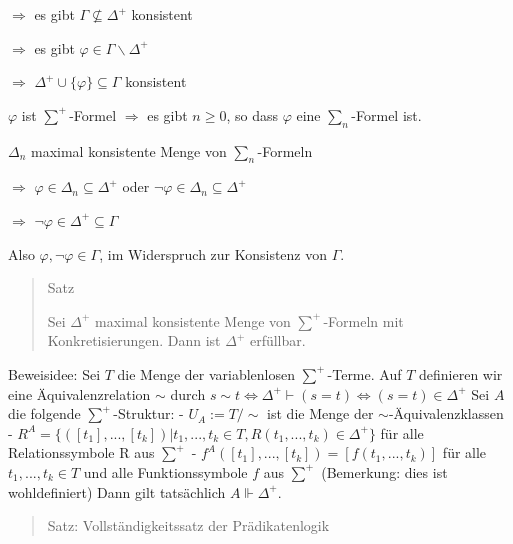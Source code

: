 \documentclass[a4paper]{article}
\begin{document}
\begin{multicols}{3}
\begin{itemize*}
          \begin{itemize*}
            \item
                  $\Rightarrow$ es gibt $\Gamma\not\subseteq\Delta^+$ konsistent
            \item
                  $\Rightarrow$ es gibt $\varphi\in\Gamma\backslash\Delta^+$
            \item
                  $\Rightarrow$ $\Delta^+\cup\{\varphi\}\subseteq\Gamma$ konsistent
            \item
                  $\varphi$ ist $\sum^+$-Formel $\Rightarrow$ es gibt $n\geq 0$, so
                  dass $\varphi$ eine $\sum_n$-Formel ist.
            \item
                  $\Delta_n$ maximal konsistente Menge von $\sum_n$-Formeln
            \item
                  $\Rightarrow$ $\varphi\in\Delta_n\subseteq\Delta^+$ oder
                  $\lnot\varphi\in\Delta_n\subseteq\Delta^+$
            \item
                  $\Rightarrow$ $\lnot\varphi\in\Delta^+\subseteq\Gamma$
            \item
                  Also $\varphi,\lnot\varphi\in\Gamma$, im Widerspruch zur Konsistenz
                  von $\Gamma$.
          \end{itemize*}
  \end{itemize*}

  \begin{quote}
    Satz

    Sei $\Delta^+$ maximal konsistente Menge von $\sum^+$-Formeln mit
    Konkretisierungen. Dann ist $\Delta^+$ erfüllbar.
  \end{quote}

  Beweisidee: Sei $T$ die Menge der variablenlosen $\sum^+$-Terme. Auf $T$
  definieren wir eine Äquivalenzrelation $\sim $ durch
  $s\sim t\Leftrightarrow \Delta^+\vdash(s=t)\Leftrightarrow (s=t)\in\Delta^+$
  Sei $A$ die folgende $\sum^+$-Struktur: - $U_A:=T/\sim $ ist die Menge der
  $\sim $-Äquivalenzklassen -
  $R^A=\{([t_1],...,[t_k])|t_1 ,...,t_k\in T,R(t_1,...,t_k)\in\Delta^+\}$
  für alle Relationssymbole R aus $\sum^+$ -
  $f^A([t_1],...,[t_k]) = [f(t_1,...,t_k)]$ für alle $t_1,...,t_k\in T$
  und alle Funktionssymbole $f$ aus $\sum^+$ (Bemerkung: dies ist
  wohldefiniert) Dann gilt tatsächlich $A\Vdash\Delta^+$.

  \begin{quote}
    Satz: Vollständigkeitssatz der Prädikatenlogik


\end{quote}
\end{multicols}
\end{document}

